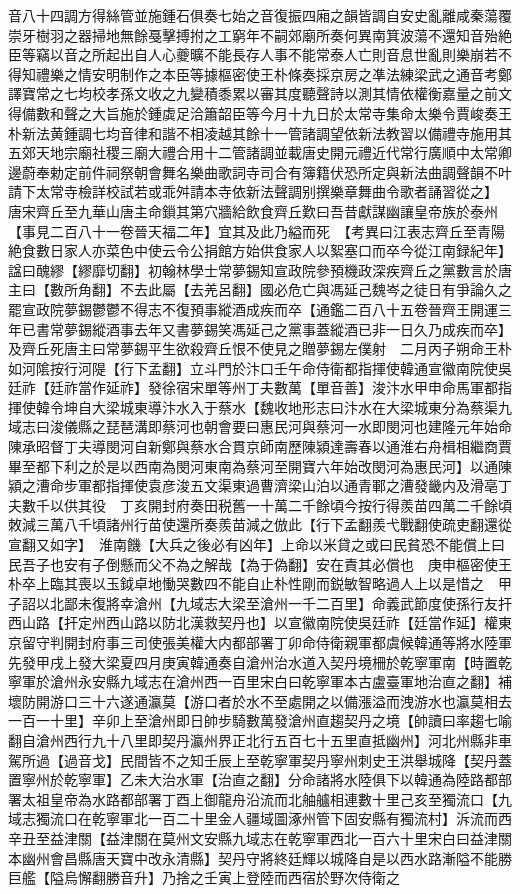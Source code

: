 音八十四調方得絲管並施鍾石俱奏七始之音復振四廂之韻皆調自安史亂離咸秦蕩覆崇牙樹羽之器掃地無餘戞擊搏拊之工窮年不嗣郊廟所奏何異南箕波蕩不還知音殆絶臣等竊以音之所起出自人心夔曠不能長存人事不能常泰人亡則音息世亂則樂崩若不得知禮樂之情安明制作之本臣等據樞密使王朴條奏採京房之凖法練梁武之通音考鄭譯寶常之七均校孝孫文收之九變積黍累以審其度聽聲詩以測其情依權衡嘉量之前文得備數和聲之大旨施於鍾虡足洽簫韶臣等今月十九日於太常寺集命太樂令賈峻奏王朴新法黄鍾調七均音律和諧不相凌越其餘十一管諸調望依新法教習以備禮寺施用其五郊天地宗廟社稷三廟大禮合用十二管諸調並載唐史開元禮近代常行廣順中太常卿邊蔚奉勅定前件祠祭朝會舞名樂曲歌詞寺司合有簿籍伏恐所定與新法曲調聲韻不叶請下太常寺檢詳校試若或乖舛請本寺依新法聲調别撰樂章舞曲令歌者誦習從之】　唐宋齊丘至九華山唐主命鎻其第穴牆給飲食齊丘歎曰吾昔獻謀幽讓皇帝族於泰州【事見二百八十一卷晉天福二年】宜其及此乃縊而死　【考異曰江表志齊丘至青陽絶食數日家人亦菜色中使云令公捐館方始供食家人以絮塞口而卒今從江南録紀年】諡曰醜繆【繆靡切翻】初翰林學士常夢錫知宣政院參預機政深疾齊丘之黨數言於唐主曰【數所角翻】不去此屬【去羌呂翻】國必危亡與馮延己魏岑之徒日有爭論久之罷宣政院夢錫鬱鬱不得志不復預事縱酒成疾而卒【通鑑二百八十五卷晉齊王開運三年已書常夢錫縱酒事去年又書夢錫笑馮延己之黨事蓋縱酒已非一日久乃成疾而卒】及齊丘死唐主曰常夢錫平生欲殺齊丘恨不使見之贈夢錫左僕射　二月丙子朔命王朴如河隂按行河隄【行下孟翻】立斗門於汴口壬午命侍衛都指揮使韓通宣徽南院使吳廷祚【廷祚當作延祚】發徐宿宋單等州丁夫數萬【單音善】浚汴水甲申命馬軍都指揮使韓令坤自大梁城東導汴水入于蔡水【魏收地形志曰汴水在大梁城東分為蔡渠九域志曰浚儀縣之琵琶溝即蔡河也朝會要曰惠民河與蔡河一水即閔河也建隆元年始命陳承昭督丁夫導閔河自新鄭與蔡水合貫京師南歷陳潁達壽春以通淮右舟楫相繼商賈畢至都下利之於是以西南為閔河東南為蔡河至開寶六年始改閔河為惠民河】以通陳潁之漕命步軍都指揮使袁彦浚五文渠東過曹濟梁山泊以通青鄆之漕發畿内及滑亳丁夫數千以供其役　丁亥開封府奏田税舊一十萬二千餘頃今按行得羨苗四萬二千餘頃敇減三萬八千頃諸州行苗使還所奏羨苗減之倣此【行下孟翻羨弋戰翻使疏吏翻還從宣翻又如字】　淮南饑【大兵之後必有凶年】上命以米貸之或曰民貧恐不能償上曰民吾子也安有子倒懸而父不為之解哉【為于偽翻】安在責其必償也　庚申樞密使王朴卒上臨其喪以玉鉞卓地慟哭數四不能自止朴性剛而鋭敏智略過人上以是惜之　甲子詔以北鄙未復將幸滄州【九域志大梁至滄州一千二百里】命義武節度使孫行友扞西山路【扞定州西山路以防北漢救契丹也】以宣徽南院使吳廷祚【廷當作延】權東京留守判開封府事三司使張美權大内都部署丁卯命侍衛親軍都虞候韓通等將水陸軍先發甲戌上發大梁夏四月庚寅韓通奏自滄州治水道入契丹境柵於乾寧軍南【時置乾寧軍於滄州永安縣九域志在滄州西一百里宋白曰乾寧軍本古盧臺軍地治直之翻】補壞防開游口三十六遂通瀛莫【游口者於水不至處開之以備漲溢而洩游水也瀛莫相去一百一十里】辛卯上至滄州即日帥步騎數萬發滄州直趨契丹之境【帥讀曰率趨七喻翻自滄州西行九十八里即契丹瀛州界正北行五百七十五里直抵幽州】河北州縣非車駕所過【過音戈】民間皆不之知壬辰上至乾寧軍契丹寧州刺史王洪舉城降【契丹蓋置寧州於乾寧軍】乙未大治水軍【治直之翻】分命諸將水陸俱下以韓通為陸路都部署太祖皇帝為水路都部署丁酉上御龍舟沿流而北舳艫相連數十里己亥至獨流口【九域志獨流口在乾寧軍北一百二十里金人疆域圖涿州管下固安縣有獨流村】泝流而西辛丑至益津關【益津關在莫州文安縣九域志在乾寧軍西北一百六十里宋白曰益津關本幽州會昌縣唐天寶中改永清縣】契丹守將終廷輝以城降自是以西水路漸隘不能勝巨艦【隘烏懈翻勝音升】乃捨之壬寅上登陸而西宿於野次侍衛之